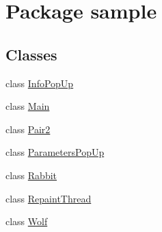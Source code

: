 \hypertarget{namespacesample}{}\section{Package sample}
\label{namespacesample}
\subsection*{Classes}
\begin{DoxyCompactItemize}
\item 
class \hyperlink{classsample_1_1_info_pop_up}{Info\+Pop\+Up}
\item 
class \hyperlink{classsample_1_1_main}{Main}
\item 
class \hyperlink{classsample_1_1_pair2}{Pair2}
\item 
class \hyperlink{classsample_1_1_parameters_pop_up}{Parameters\+Pop\+Up}
\item 
class \hyperlink{classsample_1_1_rabbit}{Rabbit}
\item 
class \hyperlink{classsample_1_1_repaint_thread}{Repaint\+Thread}
\item 
class \hyperlink{classsample_1_1_wolf}{Wolf}
\end{DoxyCompactItemize}

